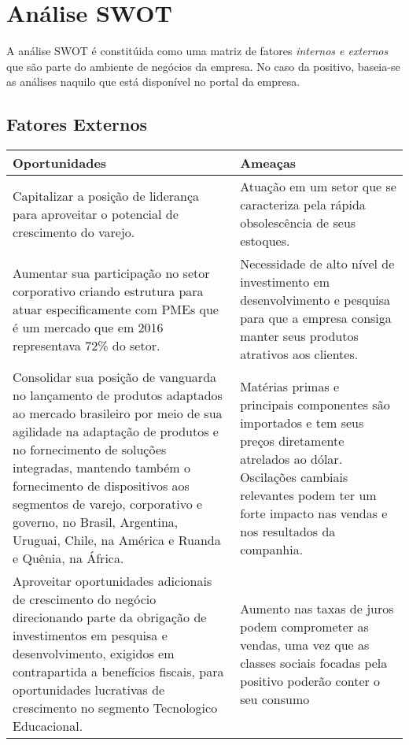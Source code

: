 {{{{\section{Análise SWOT}

A análise SWOT é constitúida como uma matriz de fatores \emph{internos e externos} que são parte do ambiente de negócios da empresa. No caso da positivo, baseia-se as análises naquilo que está disponível no portal da empresa\cite{fatoresDeRisco2018}\cite{positivo2t18}.

\subsection{Fatores Externos}

\begin{center}
\begin{table}[H]
\begin{centering}
\begin{tabular}{>{\centering}p{}|>{\centering}p{}}
\hline 
Oportunidades & Ameaças\tabularnewline
\hline 
Capitalizar a posição de liderança para aproveitar o potencial de
crescimento do varejo. & Atuação em um setor que se caracteriza pela rápida obsolescência de
seus estoques.\tabularnewline
\hline 
Aumentar sua participação no setor corporativo criando estrutura para
atuar especificamente com PMEs que é um mercado que em 2016 representava
72\% do setor.  & Necessidade de alto nível de investimento em desenvolvimento e pesquisa
para que a empresa consiga manter seus produtos atrativos aos clientes.\tabularnewline
\hline 
Consolidar sua posição de vanguarda no lançamento de produtos adaptados
ao mercado brasileiro por meio de sua agilidade na adaptação de produtos
e no fornecimento de soluções integradas, mantendo também o fornecimento
de dispositivos aos segmentos de varejo, corporativo e governo, no
Brasil, Argentina, Uruguai, Chile, na América e Ruanda e Quênia, na
África. & Matérias primas e principais componentes são importados e tem seus
preços diretamente atrelados ao dólar. Oscilações cambiais relevantes
podem ter um forte impacto nas vendas e nos resultados da companhia.\tabularnewline
\hline 
Aproveitar oportunidades adicionais de crescimento do negócio direcionando
parte da obrigação de investimentos em pesquisa e desenvolvimento,
exigidos em contrapartida a benefícios fiscais, para oportunidades
lucrativas de crescimento no segmento Tecnologico Educacional.  & Aumento nas taxas de juros podem comprometer as vendas, uma vez que
as classes sociais focadas pela positivo poderão conter o seu consumo

\end{tabular}
\end{centering}
\end{table}
\end{center}}}}}
